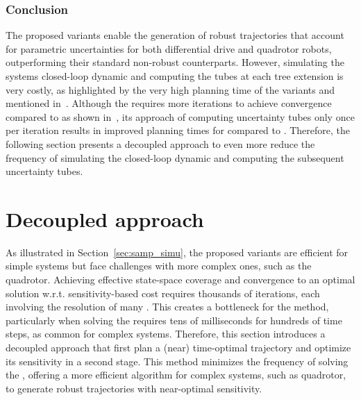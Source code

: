 \subsubsection{Conclusion}

The proposed  variants enable the generation of robust trajectories that account for parametric uncertainties for both differential drive and quadrotor robots, outperforming their standard non-robust counterparts.
However, simulating the systems closed-loop dynamic and computing the tubes at each tree extension is very costly, as highlighted by the very high planning time of the  variants and mentioned in~\cite{cTognon}.
Although the  requires more iterations to achieve convergence compared to  as shown in~\cite{cSST}, its approach of computing uncertainty tubes only once per iteration results in improved planning times for  compared to .
Therefore, the following section presents a decoupled approach to even more reduce the frequency of simulating the closed-loop dynamic and computing the subsequent uncertainty tubes.

\section{Decoupled approach}\label{sec:decoupled}

As illustrated in Section~\ref{sec:samp_simu}, the proposed  variants are efficient for simple systems but face challenges with more complex ones, such as the quadrotor. 
Achieving effective state-space coverage and convergence to an optimal solution w.r.t. sensitivity-based cost requires thousands of iterations, each involving the resolution of many . 
This creates a bottleneck for the method, particularly when solving the  requires tens of milliseconds for hundreds of time steps, as common for complex systems.
Therefore, this section introduces a decoupled approach that first plan a (near) time-optimal trajectory and optimize its sensitivity in a second stage.
This method minimizes the frequency of solving the , offering a more efficient algorithm for complex systems, such as quadrotor, to generate robust trajectories with near-optimal sensitivity.

